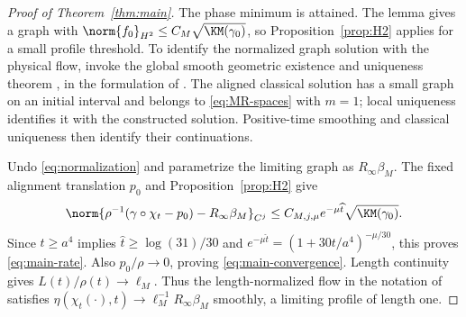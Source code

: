 \begin{proof}[Proof of Theorem~\ref{thm:main}]
The phase minimum is attained. The lemma gives a graph with $\norm{f_0}_{H^2}\le C_M\sqrt{\KM(\gamma_0)}$, so Proposition~\ref{prop:H2} applies for a small profile threshold. To identify the normalized graph solution with the physical flow, invoke the global smooth geometric existence and uniqueness theorem \cite[Theorem~3.2]{DKS}, in the formulation of \cite[Theorem~1.1]{MW}. The aligned classical solution has a small graph on an initial interval and belongs to \eqref{eq:MR-spaces} with $m=1$; local uniqueness identifies it with the constructed solution. Positive-time smoothing and classical uniqueness then identify their continuations.

Undo \eqref{eq:normalization} and parametrize the limiting graph as $R_\infty\beta_M$. The fixed alignment translation $p_0$ and Proposition~\ref{prop:H2} give
\[
 \norm{\rho^{-1}(\gamma\circ\chi_t-p_0)-R_\infty\beta_M}_{C^j}
 \le C_{M,j,\mu}e^{-\mu\widehat t}\sqrt{\KM(\gamma_0)}.
\]
Since $t\ge a^4$ implies $\widehat t\ge\log(31)/30$ and $e^{-\mu\widehat t}=(1+30t/a^4)^{-\mu/30}$, this proves \eqref{eq:main-rate}. Also $p_0/\rho\to0$, proving \eqref{eq:main-convergence}. Length continuity gives $L(t)/\rho(t)\to\ell_M$. Thus the length-normalized flow in the notation of \cite[Theorem~1.2]{MW} satisfies $\eta(\chi_t(\cdot),t)\to\ell_M^{-1}R_\infty\beta_M$ smoothly, a limiting profile of length one.
\end{proof}

